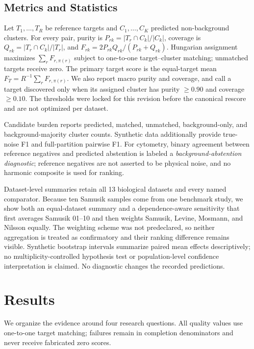 \documentclass[conference]{IEEEtran}
\begin{document}
\subsection{Metrics and Statistics}
Let $T_1,\ldots,T_R$ be reference targets and $C_1,\ldots,C_K$ predicted non-background clusters. For every pair, purity is $P_{rk}=|T_r\cap C_k|/|C_k|$, coverage is $Q_{rk}=|T_r\cap C_k|/|T_r|$, and $F_{rk}=2P_{rk}Q_{rk}/(P_{rk}+Q_{rk})$. Hungarian assignment maximizes $\sum_r F_{r,\pi(r)}$ subject to one-to-one target--cluster matching; unmatched targets receive zero. The primary target score is the equal-target mean $F_T=R^{-1}\sum_r F_{r,\pi(r)}$. We also report macro purity and coverage, and call a target discovered only when its assigned cluster has purity $\geq0.90$ and coverage $\geq0.10$. The thresholds were locked for this revision before the canonical rescore and are not optimized per dataset.

Candidate burden reports predicted, matched, unmatched, background-only, and background-majority cluster counts. Synthetic data additionally provide true-noise F1 and full-partition pairwise F1. For cytometry, binary agreement between reference negatives and predicted abstention is labeled a \emph{background-abstention diagnostic}; reference negatives are not asserted to be physical noise, and no harmonic composite is used for ranking.

Dataset-level summaries retain all 13 biological datasets and every named comparator. Because ten Samusik samples come from one benchmark study, we show both an equal-dataset summary and a dependence-aware sensitivity that first averages Samusik 01--10 and then weights Samusik, Levine, Mosmann, and Nilsson equally. The weighting scheme was not predeclared, so neither aggregation is treated as confirmatory and their ranking difference remains visible. Synthetic bootstrap intervals summarize paired mean effects descriptively; no multiplicity-controlled hypothesis test or population-level confidence interpretation is claimed. No diagnostic changes the recorded predictions.

\section{Results}
We organize the evidence around four research questions. All quality values use one-to-one target matching; failures remain in completion denominators and never receive fabricated zero scores.
\end{document}
